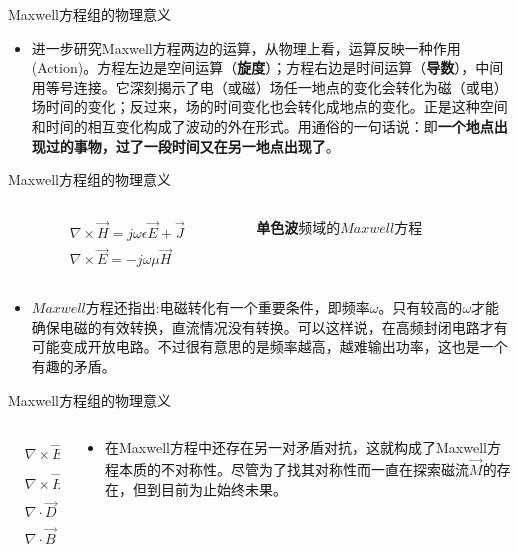 \documentclass{beamer}
\begin{document}
\begin{frame}{Maxwell方程组的物理意义}
  \begin{itemize}
    \item 进一步研究Maxwell方程两边的运算，从物理上看，运算反映一种作用(Action)。方程左边是空间运算（\textbf{旋度}）；方程右边是时间运算（\textbf{导数}），中间用等号连接。它深刻揭示了电（或磁）场任一地点的变化会转化为磁（或电）场时间的变化；反过来，场的时间变化也会转化成地点的变化。正是这种空间和时间的相互变化构成了波动的外在形式。用通俗的一句话说：即\textbf{一个地点出现过的事物，过了一段时间又在另一地点出现了}。
  \end{itemize}
\end{frame}

\begin{frame}{Maxwell方程组的物理意义}
  \begin{columns}
    \begin{column}{0.4\linewidth}
      \begin{align}
        & \nabla\times\vec{H} = j\omega\epsilon\vec{E}+\vec{J}\\
        & \nabla\times\vec{E} = -j\omega\mu\vec{H}
      \end{align}
    \end{column}
    \begin{column}{0.6\linewidth}
      \textbf{单色波}频域的$Maxwell$方程
    \end{column}
  \end{columns}
\begin{itemize}
  \item $Maxwell$方程还指出:电磁转化有一个重要条件，即频率$\omega$。只有较高的$\omega$才能确保电磁的有效转换，直流情况没有转换。可以这样说，在高频封闭电路才有可能变成开放电路。不过很有意思的是频率越高，越难输出功率，这也是一个有趣的矛盾。
\end{itemize}
\end{frame}

\begin{frame}{Maxwell方程组的物理意义}
  \begin{columns}
    \begin{column}{0.4\linewidth}
      \begin{align}
        &\nabla\times\vec E=-\frac{\partial \vec B}{\partial t}\\
        &\nabla\times\vec H=\vec{J} +\frac{\partial \vec D}{\partial t}\\
        &\nabla\cdot\vec{D}=\rho\\
        &\nabla\cdot\vec{B}=0
      \end{align}
    \end{column}
    \begin{column}{0.65\linewidth}
      \begin{itemize}
        \item 在Maxwell方程中还存在另一对矛盾对抗，这就构成了Maxwell方程本质的不对称性。尽管为了找其对称性而一直在探索磁流$\vec{M}$的存在，但到目前为止始终未果。
      \end{itemize}
    \end{column}
  \end{columns}
\end{frame}
\end{document}
